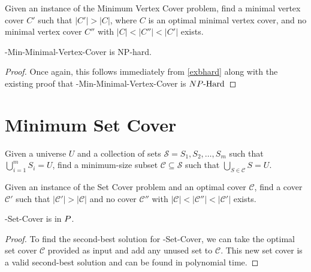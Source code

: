 \begin{definition}
Given an instance of the Minimum Vertex Cover problem, find a minimal vertex cover $C'$ such that $|C'| > |C|$, where $C$ is an optimal minimal vertex cover, and no minimal vertex cover $C''$ with $|C| < |C''| < |C'|$ exists.
\end{definition}

\begin{theorem}
\exb{}-Min-Minimal-Vertex-Cover is NP-hard.
\end{theorem}

\begin{proof}
Once again, this follows immediately from \autoref{exbhard} along with the existing proof that \exob{}-Min-Minimal-Vertex-Cover is ${NP\text{-Hard{}}}$ 
\end{proof}

\section{Minimum Set Cover}
\begin{definition}
Given a universe $U$ and a collection of sets $\mathcal{S} = {S_1, S_2, \dots, S_m}$ such that $\bigcup_{i=1}^{m} S_i = U$, find a minimum-size subset $\mathcal{C} \subseteq \mathcal{S}$ such that $\bigcup_{S \in \mathcal{C}} S = U$.
\end{definition}

\begin{definition}
Given an instance of the Set Cover problem and an optimal cover $\mathcal{C}$, find a cover $\mathcal{C}'$ such that $|\mathcal{C}'| > |\mathcal{C}|$ and no cover $\mathcal{C}''$ with $|\mathcal{C}| < |\mathcal{C}''| < |\mathcal{C}'|$ exists.
\end{definition}

\begin{theorem}
\exob{}-Set-Cover is in ${P}{}$.
\end{theorem}
\begin{proof}
To find the second-best solution for \exob{}-Set-Cover, we can take the optimal set cover $\mathcal{C}$ provided as input and add any unused set to $\mathcal{C}$. This new set cover is a valid second-best solution and can be found in polynomial time.
\end{proof}

